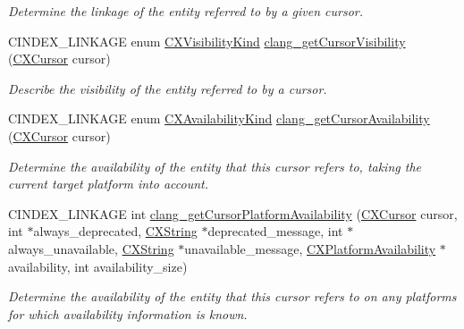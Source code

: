 \begin{DoxyCompactItemize}
\begin{DoxyCompactList}\small\item\em Determine the linkage of the entity referred to by a given cursor. \end{DoxyCompactList}\item 
C\+I\+N\+D\+E\+X\+\_\+\+L\+I\+N\+K\+A\+GE enum \mbox{\hyperlink{group__CINDEX__CURSOR__MANIP_gaf92fafb489ab66529aceab51818994cb}{C\+X\+Visibility\+Kind}} \mbox{\hyperlink{group__CINDEX__CURSOR__MANIP_ga935b442bd6bde168cf354b7629b471d8}{clang\+\_\+get\+Cursor\+Visibility}} (\mbox{\hyperlink{structCXCursor}{C\+X\+Cursor}} cursor)
\begin{DoxyCompactList}\small\item\em Describe the visibility of the entity referred to by a cursor. \end{DoxyCompactList}\item 
C\+I\+N\+D\+E\+X\+\_\+\+L\+I\+N\+K\+A\+GE enum \mbox{\hyperlink{group__CINDEX_gada331ea0195e952c8f181ecf15e83d71}{C\+X\+Availability\+Kind}} \mbox{\hyperlink{group__CINDEX__CURSOR__MANIP_gab44e2a565fa40a0e0fc0f130f618a9b5}{clang\+\_\+get\+Cursor\+Availability}} (\mbox{\hyperlink{structCXCursor}{C\+X\+Cursor}} cursor)
\begin{DoxyCompactList}\small\item\em Determine the availability of the entity that this cursor refers to, taking the current target platform into account. \end{DoxyCompactList}\item 
C\+I\+N\+D\+E\+X\+\_\+\+L\+I\+N\+K\+A\+GE int \mbox{\hyperlink{group__CINDEX__CURSOR__MANIP_gaab07659398c4538771d62c81ca5dea69}{clang\+\_\+get\+Cursor\+Platform\+Availability}} (\mbox{\hyperlink{structCXCursor}{C\+X\+Cursor}} cursor, int $\ast$always\+\_\+deprecated, \mbox{\hyperlink{structCXString}{C\+X\+String}} $\ast$deprecated\+\_\+message, int $\ast$always\+\_\+unavailable, \mbox{\hyperlink{structCXString}{C\+X\+String}} $\ast$unavailable\+\_\+message, \mbox{\hyperlink{structCXPlatformAvailability}{C\+X\+Platform\+Availability}} $\ast$availability, int availability\+\_\+size)
\begin{DoxyCompactList}\small\item\em Determine the availability of the entity that this cursor refers to on any platforms for which availability information is known. \end{DoxyCompactList}\item 
\mbox{\label{group__CINDEX__CURSOR__MANIP_ga1acfac399add40f7240e02f9f5f1a6d9}} 

\end{DoxyCompactItemize}
